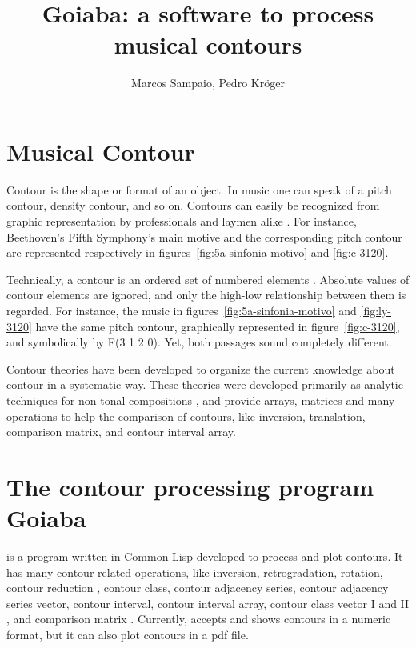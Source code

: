 \documentclass[a0paper]{sciposter}
\title{Goiaba: a software to process musical contours}
\author{Marcos Sampaio, Pedro Kröger}
\institute{Genos---Computer Music Research Group \\
Federal University of Bahia (UFBA). Salvador, Brazil}
\begin{document}



\maketitle

\begin{multicols}{3}

\section{Musical Contour}

Contour is the shape or format of an object. In music one can speak of
a pitch contour, density contour, and so on. Contours can easily be
recognized from graphic representation by professionals and laymen
alike \cite{marvin88:generalized}. For instance, Beethoven's Fifth
Symphony's main motive and the corresponding pitch contour are
represented respectively in figures~\ref{fig:5a-sinfonia-motivo} and
\ref{fig:c-3120}.

Technically, a contour is an ordered set of numbered elements
\cite{morris93:directions}. Absolute values of contour elements are
ignored, and only the high-low relationship between them is regarded.
For instance, the music in figures~\ref{fig:5a-sinfonia-motivo} and
\ref{fig:ly-3120} have the same pitch contour, graphically represented
in figure~\ref{fig:c-3120}, and symbolically by F(3 1 2 0). Yet, both
passages sound completely different.

Contour theories
\cite{friedmann85:methodology,morris87:composition,marvin88:generalized,beard03:contour}
have been developed to organize the current knowledge about contour in
a systematic way. These theories were developed primarily as analytic
techniques for non-tonal compositions \cite{beard03:contour}, and
provide arrays, matrices and many operations to help the comparison of
contours, like inversion, translation, comparison matrix, and contour
interval array.

\section{The contour processing program Goiaba}

\goiaba{} is a program written in Common Lisp developed to process and
plot contours. It has many contour-related operations, like inversion,
retrogradation, rotation, contour reduction \cite{adams76:melodic},
contour class, contour adjacency series, contour adjacency series
vector, contour interval, contour interval array, contour class vector
I and II \cite{friedmann85:methodology}, and comparison matrix
\cite{morris93:directions}. Currently, \goiaba{} accepts and shows
contours in a numeric format, but it can also plot contours in a pdf
file.


\end{multicols}
\end{document}
